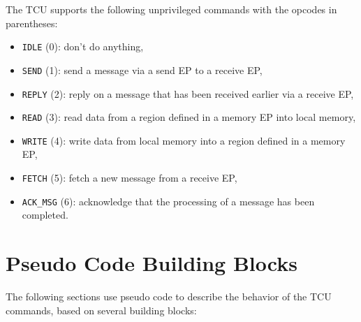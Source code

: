 The TCU supports the following unprivileged commands with the opcodes in parentheses:

\begin{itemize}
  \item \texttt{IDLE} (0): don't do anything,
  \item \texttt{SEND} (1): send a message via a send EP to a receive EP,
  \item \texttt{REPLY} (2): reply on a message that has been received earlier via a receive EP,
  \item \texttt{READ} (3): read data from a region defined in a memory EP into local memory,
  \item \texttt{WRITE} (4): write data from local memory into a region defined in a memory EP,
  \item \texttt{FETCH} (5): fetch a new message from a receive EP,
  \item \texttt{ACK\_MSG} (6): acknowledge that the processing of a message has been completed.
\end{itemize}

\section{Pseudo Code Building Blocks}
\label{sec:unprivcmdspseudo}

The following sections use pseudo code to describe the behavior of the TCU commands, based on
several building blocks:

